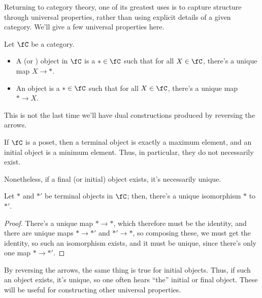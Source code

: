 Returning to category theory, one of its greatest uses is to capture structure through universal properties, rather
than using explicit details of a given category. We'll give a few universal properties here.
\begin{defn}
Let \(\fC\) be a category.
\begin{itemize}
	\item A  (or ) object in \(\fC\) is a \(*\in\fC\) such that for all \(X\in\fC\),
	there's a unique map \(X\to*\).
	\item An  object is a \(*\in\fC\) such that for all \(X\in\fC\), there's a unique map \(*\to X\).
\end{itemize}
\end{defn}
This is not the last time we'll have dual constructions produced by reversing the arrows.
\begin{exm}
If \(\fC\) is a poset, then a terminal object is exactly a maximum element, and an initial object is a minimum
element. Thus, in particular, they do not necessarily exist.
\end{exm}
Nonetheless, if a final (or initial)  object exists, it's necessarily unique.
\begin{prop}
Let \(*\) and \(*'\) be terminal objects in \(\fC\); then, there's a unique isomorphism \(*\) to \(*'\).
\end{prop}
\begin{proof}
There's a unique map \(*\to *\), which therefore must be the identity, and there are unique maps \(*\to *'\) and
\(*'\to *\), so composing these, we must get the identity, so such an isomorphism exists, and it must be unique,
since there's only one map \(*\to *'\).
\end{proof}
By reversing the arrows, the same thing is true for initial objects. Thus, if such an object exists, it's unique,
so one often hears ``the'' initial or final object. These will be useful for constructing other universal
properties.
